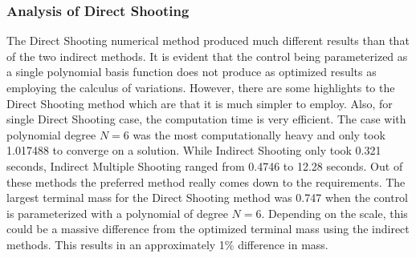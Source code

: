 \documentclass[]{article}
\begin{document}
\subsubsection{Analysis of Direct Shooting}
The Direct Shooting numerical method produced much different results than that of the two indirect methods. It is evident that the control being parameterized as a single polynomial basis function does not produce as optimized results as employing the calculus of variations. However, there are some highlights to the Direct Shooting method which are that it is much simpler to employ. Also, for single Direct Shooting case, the computation time is very efficient. The case with polynomial degree \(N = 6\) was the most computationally heavy and only took 1.017488 to converge on a solution. While Indirect Shooting only took 0.321 seconds, Indirect Multiple Shooting ranged from 0.4746 to 12.28 seconds. Out of these methods the preferred method really comes down to the requirements. The largest terminal mass for the Direct Shooting method was 0.747 when the control is parameterized with a polynomial of degree \(N = 6\). Depending on the scale, this could be a massive difference from the optimized terminal mass using the indirect methods. This results in an approximately 1\% difference in mass.
\end{document}
